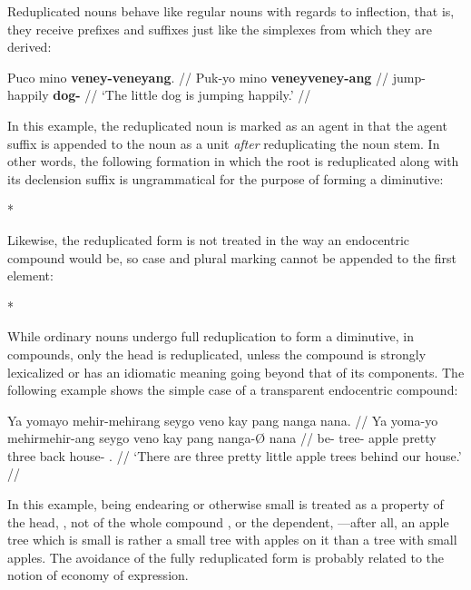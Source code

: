 Reduplicated nouns behave like regular nouns with regards to inflection, that 
is, they receive prefixes and suffixes just like the simplexes from which they 
are derived:

\ex\begingl
	\gla Puco mino \textbf{veney-veneyang}. //
	\glb Puk-yo mino \textbf{veney\til{}veney-ang} //
	\glc jump-\TsgN{} happily \textbf{\Dim{}\til{}dog-\Aarg{}} //
	\glft `The little dog is jumping happily.' //
\endgl\xe

In this example, the reduplicated noun  is 
marked as an agent in that the agent suffix  is appended to 
the noun as a unit \emph{after} reduplicating the noun stem. In other words, 
the following formation in which the root is reduplicated along with its 
declension suffix is ungrammatical for the purpose of forming a diminutive:

\ex
	*
\xe

Likewise, the reduplicated form is not treated in the way an endocentric 
compound would be, so case and plural marking cannot be appended to the first 
element:

\ex
	*
\xe

While ordinary nouns undergo full reduplication to form a diminutive, in 
compounds, only the head is reduplicated, unless the compound is strongly 
lexicalized or has an idiomatic meaning going beyond that of its components. 
The following example shows the simple case of a transparent endocentric 
compound:

\ex\begingl
	\gla Ya yomayo mehir-mehirang seygo veno kay pang nanga nana. //
	\glb Ya yoma-yo mehir\til{}mehir-ang seygo veno kay pang nanga-Ø nana //
	\glc \LocT{} be-\TsgN{} \Dim{}\til{}tree-\Aarg{} apple pretty three 
		back house-\Top{} \Fpl{}.\Gen{} //
	\glft `There are three pretty little apple trees behind our house.' //
\endgl\xe

In this example, being endearing or otherwise small is treated as a property of 
the head, , not of the whole compound 
, or the dependent, 
---after all, an apple tree which is small is 
rather a small tree with apples on it than a tree with small apples. The 
avoidance of the fully reduplicated form 
 is probably related to 
the notion of economy of expression.


